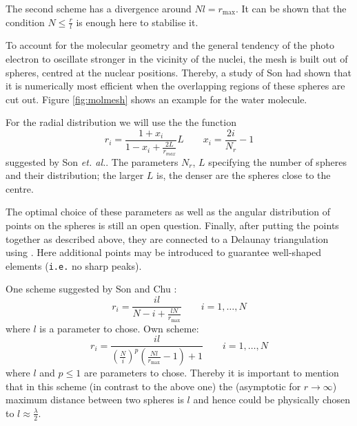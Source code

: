 The second scheme has a divergence around $Nl=r_\text{max}$. 
It can be shown that the condition $N\leq \frac rl $ is enough here to stabilise it.


To account for the molecular geometry and the general tendency of the photo electron to oscillate stronger in the vicinity of the nuclei, the mesh is built out of spheres, centred at the nuclear positions.
Thereby, a study of Son \cite{Son_Chu0} had shown that it is numerically most efficient when the overlapping regions of these spheres are cut out.
Figure \ref{fig:molmesh} shows an example for the water molecule.

For the radial distribution we will use the the function
\[
r_i = \frac{1+x_i}{1-x_i+\frac{2L}{r_{max}}} L \qquad x_i = \frac{2i}{N_r} -1
\]
suggested by Son \textit{et. al.}\cite{Son_Chu0, Son_Chu}.
The parameters $N_r$, $L$ specifying the number of spheres and their distribution; the larger $L$ is, the denser are the spheres close to the centre.

The optimal choice of these parameters as well as the angular distribution of points on the spheres is still an open question.
Finally, after putting the points together as described above, they are connected to a Delaunay triangulation using  \cite{tetgen}. 
Here additional points may be introduced to guarantee well-shaped elements (\texttt{i.e.} no sharp peaks).

One scheme suggested by Son and Chu \cite{Son_Chu0}:
\begin{equation} \label{eq:son_map}
r_i=\frac{il}{N-i+\frac{lN}{r_\text{max}}} \qquad i=1,\hdots ,N 
\end{equation}
where $l$ is a parameter to chose.
Own scheme:
\begin{equation} \label{eq:tm_map}
r_i=\frac{il}{\left( \frac Ni \right)^p \left(\frac{Nl}{r_\text{max}}-1\right) +1} \qquad i=1,\hdots ,N 
\end{equation}
where $l$ and $p\leq 1$ are parameters to chose. Thereby it is important to mention that in this scheme (in contrast to the above one) the (asymptotic for $r\rightarrow \infty$) maximum distance between two spheres is $l$ and hence could be physically chosen to $l\approx \frac \lambda 2$.

